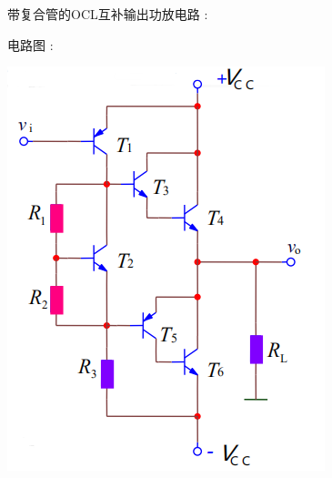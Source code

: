 \documentclass[UTF8, 12pt]{ctexart}
\begin{document}
	带复合管的OCL互补输出功放电路 :

	电路图 :

	\includegraphics[scale = 0.4]{04/带复合管的OCL互补输出功放电路电路图.png}
\end{document}

